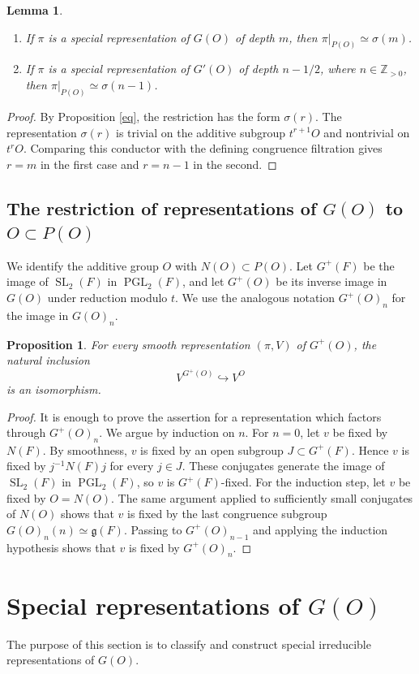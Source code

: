 \documentclass[11pt,a4paper,twoside]{amsart}
\newtheorem{lemma}[theorem]{Lemma}
\newtheorem{proposition}[theorem]{Proposition}
\theoremstyle{definition}
\theoremstyle{remark}
\newcommand{\bs}{\sigma}
\newcommand{\ZZ}{\mathbb Z}
\newcommand{\fg}{\mathfrak g}
\newcommand{\SL}{\operatorname{SL}}
\newcommand{\PGL}{\operatorname{PGL}}
\begin{document}
\begin{lemma}\label{restr}
\begin{enumerate}
\item If $\pi$ is a special representation of $G(O)$ of depth $m$, then $\pi|_{P(O)}\simeq\bs(m)$.
\item If $\pi$ is a special representation of $G'(O)$ of depth $n-1/2$, where $n\in\ZZ_{>0}$, then $\pi|_{P(O)}\simeq\bs(n-1)$.
\end{enumerate}
\end{lemma}
\begin{proof}
By Proposition \ref{eq}, the restriction has the form $\bs(r)$. The representation $\bs(r)$ is trivial on the additive subgroup $t^{r+1}O$ and nontrivial on $t^rO$. Comparing this conductor with the defining congruence filtration gives $r=m$ in the first case and $r=n-1$ in the second.
\end{proof}
\subsection{The restriction of representations of $G(O)$ to $O\subset P(O)$}
We identify the additive group $O$ with $N(O)\subset P(O)$. Let $G^+(F)$ be the image of $\SL_2(F)$ in $\PGL_2(F)$, and let $G^+(O)$ be its inverse image in $G(O)$ under reduction modulo $t$. We use the analogous notation $G^+(O)_n$ for the image in $G(O)_n$.
\begin{proposition}\label{infty}
For every smooth representation $(\pi,V)$ of $G^+(O)$, the natural inclusion
$$
V^{G^+(O)}\hookrightarrow V^O
$$
is an isomorphism.
\end{proposition}
\begin{proof}
It is enough to prove the assertion for a representation which factors through $G^+(O)_n$. We argue by induction on $n$. For $n=0$, let $v$ be fixed by $N(F)$. By smoothness, $v$ is fixed by an open subgroup $J\subset G^+(F)$. Hence $v$ is fixed by $j^{-1}N(F)j$ for every $j\in J$. These conjugates generate the image of $\SL_2(F)$ in $\PGL_2(F)$, so $v$ is $G^+(F)$-fixed.
For the induction step, let $v$ be fixed by $O=N(O)$. The same argument applied to sufficiently small conjugates of $N(O)$ shows that $v$ is fixed by the last congruence subgroup $G(O)_n(n)\simeq\fg(F)$. Passing to $G^+(O)_{n-1}$ and applying the induction hypothesis shows that $v$ is fixed by $G^+(O)_n$.
\end{proof}
\section{Special representations of $G(O)$}\label{GO}
The purpose of this section is to classify and construct special irreducible representations of $G(O)$.
\end{document}
